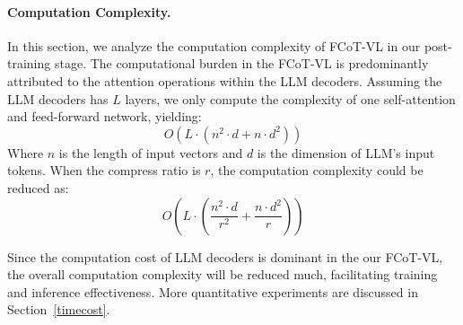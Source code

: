 \paragraph{Computation Complexity.} 
In this section, we analyze the computation complexity of FCoT-VL in our post-training stage. The computational burden in the FCoT-VL is predominantly attributed to the attention operations within the LLM decoders. Assuming the LLM decoders has \( L\) layers, we only compute the complexity of one self-attention and feed-forward network, yielding: 
\begin{equation}
O(L \cdot (n^2 \cdot d + n \cdot d^2))
\end{equation}
Where $n$ is the length of input vectors and $d$ is the dimension of LLM's input tokens. When the compress ratio is $r$, the computation complexity could be reduced as:
\begin{equation}\label{eq_7}
O(L \cdot (\frac{n^2 \cdot d}{r^2}  + \frac{n \cdot d^2}{r}))
\end{equation}

Since the computation cost of LLM decoders is dominant in the our FCoT-VL, the overall computation complexity will be reduced much, facilitating training and inference effectiveness. More quantitative experiments are discussed in Section~\ref{timecost}.




